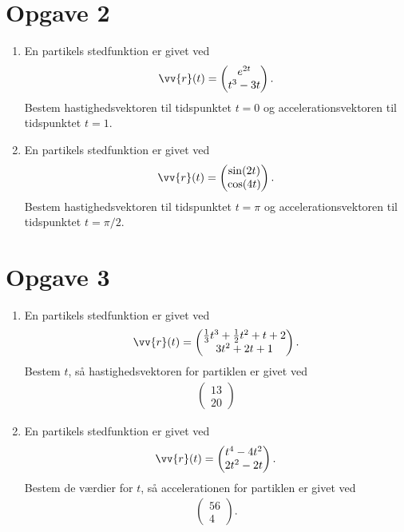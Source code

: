 \section*{Opgave 2}

\begin{enumerate}[label=\roman*)]
	\item En partikels stedfunktion er givet ved
	\begin{align*}
		\vv{r}(t) = 
		\begin{pmatrix}
			e^{2t} \\
			t^3-3t
		\end{pmatrix}.
	\end{align*}
	Bestem hastighedsvektoren til tidspunktet $t=0$ og accelerationsvektoren til tidspunktet $t=1$. 
	\item En partikels stedfunktion er givet ved
	\begin{align*}
		\vv{r}(t) = 
		\begin{pmatrix}
			\sin(2t) \\
			\cos(4t)
		\end{pmatrix}.
	\end{align*}
	Bestem hastighedsvektoren til tidspunktet $t=\pi$ og accelerationsvektoren til tidspunktet $t=\pi/2$.
\end{enumerate}

\section*{Opgave 3}

\begin{enumerate}[label=\roman*)]
	\item En partikels stedfunktion er givet ved
	\begin{align*}
		\vv{r}(t) = 
		\begin{pmatrix}
			\frac{1}{3}t^3 + \frac{1}{2}t^2+t+2 \\
			3t^2+2t+1
		\end{pmatrix}.
	\end{align*}
	Bestem $t$, så hastighedsvektoren for partiklen er givet ved
	\begin{align*}
		\begin{pmatrix}
			13 \\
			20
		\end{pmatrix}
	\end{align*}
	\item En partikels stedfunktion er givet ved
	\begin{align*}
		\vv{r}(t) = 
		\begin{pmatrix}
			t^4-4t^2 \\
			2t^2-2t
		\end{pmatrix}.
	\end{align*}
	Bestem de værdier for $t$, så accelerationen for partiklen er givet ved
	\begin{align*}
		\begin{pmatrix}
			56 \\
			4
		\end{pmatrix}.
	\end{align*}
\end{enumerate}

